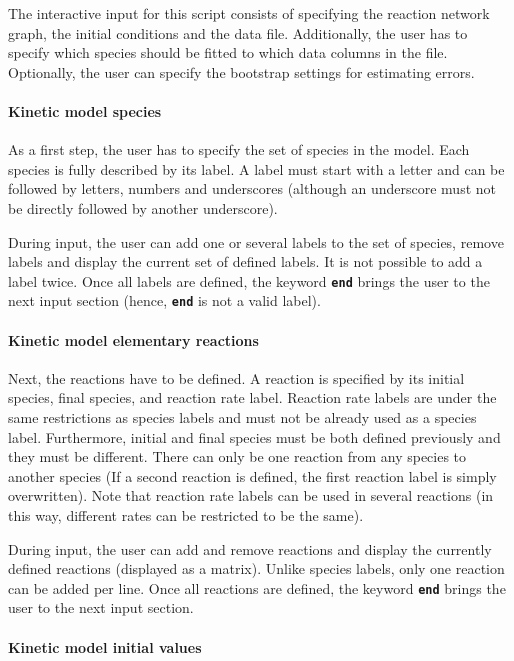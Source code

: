 \documentclass[a4paper,10pt,DIV=15,openany]{scrbook}
\newcommand{\ttt}[1]{\textbf{\texttt{#1}}}
\begin{document}
The interactive input for this script consists of specifying the reaction network graph, the initial conditions and the data file.
Additionally, the user has to specify which species should be fitted to which data columns in the file.
Optionally, the user can specify the bootstrap settings for estimating errors.

\paragraph{Kinetic model species}

As a first step, the user has to specify the set of species in the model.
Each species is fully described by its label.
A label must start with a letter and can be followed by letters, numbers and underscores (although an underscore must not be directly followed by another underscore).

During input, the user can add one or several labels to the set of species, remove labels and display the current set of defined labels.
It is not possible to add a label twice.
Once all labels are defined, the keyword \ttt{end} brings the user to the next input section (hence, \ttt{end} is not a valid label).

\paragraph{Kinetic model elementary reactions}

Next, the reactions have to be defined.
A reaction is specified by its initial species, final species, and reaction rate label.
Reaction rate labels are under the same restrictions as species labels and must not be already used as a species label.
Furthermore, initial and final species must be both defined previously and they must be different.
There can only be one reaction from any species to another species (If a second reaction is defined, the first reaction label is simply overwritten).
Note that reaction rate labels can be used in several reactions (in this way, different rates can be restricted to be the same).

During input, the user can add and remove reactions and display the currently defined reactions (displayed as a matrix).
Unlike species labels, only one reaction can be added per line.
Once all reactions are defined, the keyword \ttt{end} brings the user to the next input section.

\paragraph{Kinetic model initial values}
\end{document}
